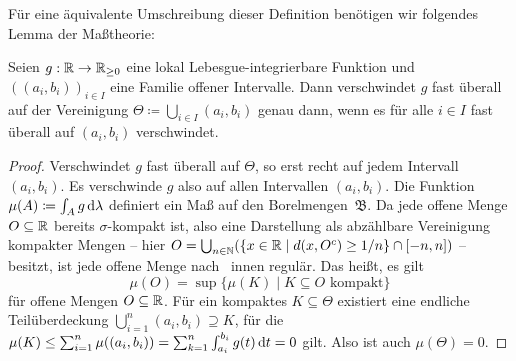 Für eine äquivalente Umschreibung dieser Definition benötigen wir folgendes Lemma der Maßtheorie:

\begin{lemma}\label{lemma-vanishes-intervals}
	Seien $g: \mathbb{R} \to \mathbb{R}_{\geq 0}$ eine lokal Lebesgue-integrierbare Funktion und $((a_i, b_i))_{i\in I}$ eine Familie offener Intervalle.
	Dann verschwindet $g$ fast überall auf der Vereinigung $\Theta\coloneq \bigcup_{i\in I} (a_i, b_i)$ genau dann, wenn es für alle $i\in I$ fast überall auf $(a_i, b_i)$ verschwindet.
\end{lemma}
\begin{proof}
	Verschwindet $g$ fast überall auf $\Theta$, so erst recht auf jedem Intervall $(a_i, b_i)$.
	Es verschwinde $g$ also auf allen Intervallen $(a_i, b_i)$.
	Die Funktion $\mu(A)\coloneq \int_A g \mathop{}\!\mathrm{d} \lambda$ definiert ein Maß auf den Borelmengen~$\mathfrak{B}$.
	Da jede offene Menge $O\subseteq\mathbb{R}$ bereits $\sigma$-kompakt ist, also eine Darstellung als abzählbare Vereinigung kompakter Mengen -- hier $O=\bigcup_{n\in\mathbb{N}}(\{ x \in\mathbb{R} \mid d(x, O^c) \geq 1/n \} \cap [-n, n] )$ -- besitzt, ist jede offene Menge nach~\cite[Kap. VIII, 1.2 Folgerungen (e)]{Elstrodt2011} innen regulär.
	Das heißt, es gilt
	\[ \mu(O)=\sup\{ \mu(K) \mid K\subseteq O \text{ kompakt} \} \]
	für offene Mengen $O\subseteq\mathbb{R}$.
	Für ein kompaktes $K\subseteq \Theta$ existiert eine endliche Teil\-über\-deckung $\bigcup_{i=1}^n (a_i, b_i) \supseteq K$, für die $\mu(K) \leq \sum_{i=1}^{n} \mu((a_i, b_i)) = \sum_{k=1}^{n} \int_{a_i}^{b_i} g(t) \mathop{}\!\mathrm{d} t = 0$ gilt.
	Also ist auch $\mu(\Theta)=0$.
\end{proof}

